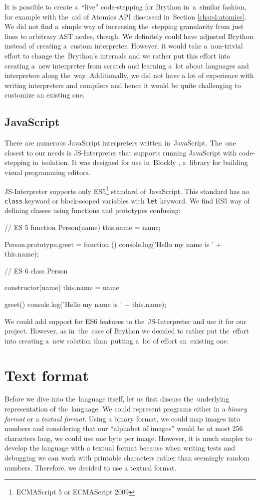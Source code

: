 It is possible to create a~``live'' code-stepping for Brython in~a~similar fashion, for example with the~aid of Atomics API discussed in~Section \ref{chap4:atomics}.
We did not find a~simple way of increasing the~stepping granularity from just lines to arbitrary AST nodes, though. We definitely could have adjusted Brython instead
of creating a~custom interpreter. However, it would take a~non-trivial effort to change the~Brython's internals and we rather put this effort into creating
a~new interpreter from scratch and learning a~lot about languages and interpreters along the~way. Additionally, we did not have a lot of experience with writing
interpreters and compilers and hence it would be quite challenging to customize an existing one.

\subsection{JavaScript}
\label{chap3:javascript}
There are numerous JavaScript interpreters written in~JavaScript. The~one closest to our needs is JS-Interpreter \cite{JSInterpreter} that supports running JavaScript
with code-stepping in~isolation. It was designed for use in~Blockly \cite{Blockly}, a~library for building visual programming editors.

JS-Interpreter supports only ES5\footnote{ECMAScript 5 or ECMAScript 2009} standard of JavaScript. This standard has no \texttt{class} keyword or block-scoped
variables with \texttt{let} keyword. We find ES5 way of defining classes using functions and prototypes confusing:
\begin{code}
// ES 5
function Person(name) {
    this.name = name;  
}

Person.prototype.greet = function () {
    console.log('Hello my name is ' + this.name);
}

// ES 6
class Person {
    constructor(name) {
        this.name = name
    }

    greet() {
        console.log('Hello my name is ' + this.name);
    }
}
\end{code}

We could add support for ES6 features to the~JS-Interpreter and use it for our project. However, as in~the~case of Brython we decided to rather put the~effort into
creating a~new solution than~putting a~lot of effort an~existing one.

\section{Text format}
Before we dive into the~language itself, let us first discuss the~underlying representation of the~language. We could represent programs either
in a \emph{binary format} or a \emph{textual format}. Using a binary format, we could map images into numbers and considering that our ``alphabet of images''
would be at most 256 characters long, we could use one byte per image. However, it is much simpler to develop the language with a textual format because
when writing tests and debugging we can work with printable characters rather than seemingly random numbers. Therefore, we decided to use a textual format.

